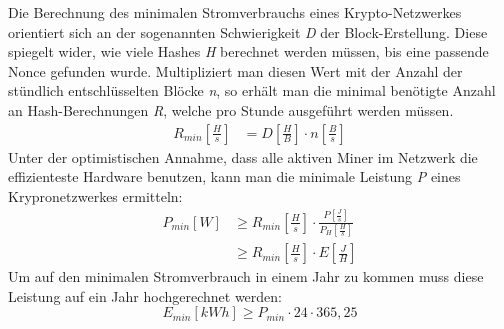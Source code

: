 Die Berechnung des minimalen Stromverbrauchs eines Krypto-Netzwerkes orientiert sich an der sogenannten Schwierigkeit \textit{D} der Block-Erstellung. Diese spiegelt wider, wie viele Hashes \textit{H} berechnet werden müssen, bis eine passende Nonce gefunden wurde. Multipliziert man diesen Wert mit der Anzahl der stündlich entschlüsselten Blöcke \textit{n}, so erhält man die minimal benötigte Anzahl an Hash-Berechnungen \textit{R}, welche pro Stunde ausgeführt werden müssen.
\begin{align}
    R_{min}\left[\frac{H}{s}\right]&=D\left[\frac{H}{B}\right]\cdot n\left[\frac{B}{s}\right]
\end{align}
\clearpage
\noindent Unter der optimistischen Annahme, dass alle aktiven Miner im Netzwerk die effizienteste Hardware benutzen, kann man die minimale Leistung \textit{P} eines Krypronetzwerkes ermitteln:
\begin{align*}
    P_{min} [W]&\geq R_{min}\left[\frac{H}{s}\right]\cdot \frac{P\left[\frac{J}{s}\right]}{P_H\left[\frac{H}{s}\right]}\\
    &\geq R_{min}\left[\frac{H}{s}\right]\cdot E\left[\frac{J}{H}\right]
\end{align*}
Um auf den minimalen Stromverbrauch in einem Jahr zu kommen muss diese Leistung auf ein Jahr hochgerechnet werden:
\[ E_{min} [kWh] \geq P_{min}\cdot 24\cdot 365,25\]